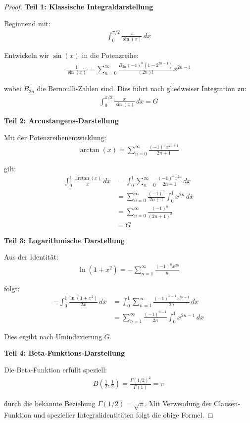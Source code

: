 \documentclass[a4paper,12pt,twoside]{report}
\theoremstyle{definition}
\begin{document}
\begin{proof}
\textbf{Teil 1: Klassische Integraldarstellung}

Beginnend mit:
\begin{align}
	\int_0^{\pi/2} \frac{x}{\sin(x)} \, dx
\end{align}

Entwickeln wir $\sin(x)$ in die Potenzreihe:
\begin{align}
	\frac{1}{\sin(x)} = \sum_{n=0}^{\infty} \frac{B_{2n} (-4)^n (1-2^{2n-1})}{(2n)!} x^{2n-1}
\end{align}

wobei $B_{2n}$ die Bernoulli-Zahlen sind. Dies führt nach gliedweiser Integration zu:
\begin{align}
	\int_0^{\pi/2} \frac{x}{\sin(x)} \, dx = G
\end{align}

\textbf{Teil 2: Arcustangens-Darstellung}

Mit der Potenzreihenentwicklung:
\begin{align}
	\arctan(x) = \sum_{n=0}^{\infty} \frac{(-1)^n x^{2n+1}}{2n+1}
\end{align}

gilt:
\begin{align}
	\int_0^1 \frac{\arctan(x)}{x} \, dx &= \int_0^1 \sum_{n=0}^{\infty} \frac{(-1)^n x^{2n}}{2n+1} \, dx \\
	&= \sum_{n=0}^{\infty} \frac{(-1)^n}{2n+1} \int_0^1 x^{2n} \, dx \\
	&= \sum_{n=0}^{\infty} \frac{(-1)^n}{(2n+1)^2} \\
	&= G
\end{align}

\textbf{Teil 3: Logarithmische Darstellung}

Aus der Identität:
\begin{align}
	\ln(1+x^2) = -\sum_{n=1}^{\infty} \frac{(-1)^n x^{2n}}{n}
\end{align}

folgt:
\begin{align}
	-\int_0^1 \frac{\ln(1+x^2)}{2x} \, dx &= \int_0^1 \sum_{n=1}^{\infty} \frac{(-1)^{n-1} x^{2n-1}}{2n} \, dx \\
	&= \sum_{n=1}^{\infty} \frac{(-1)^{n-1}}{2n} \int_0^1 x^{2n-1} \, dx
\end{align}

Dies ergibt nach Umindexierung $G$.

\textbf{Teil 4: Beta-Funktions-Darstellung}

Die Beta-Funktion erfüllt speziell:
\begin{align}
	B\left(\frac{1}{2}, \frac{1}{2}\right) = \frac{\Gamma(1/2)^2}{\Gamma(1)} = \pi
\end{align}

durch die bekannte Beziehung $\Gamma(1/2) = \sqrt{\pi}$. Mit Verwendung der Clausen-Funktion und spezieller Integralidentitäten folgt die obige Formel.
\end{proof}
\end{document}
